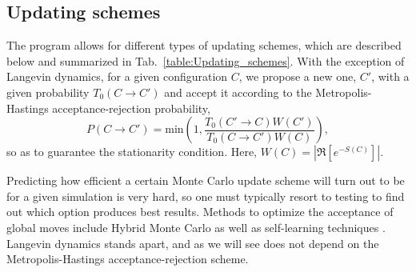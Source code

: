 
\subsection{Updating schemes}\label{sec:updating}
%
The program allows for different types of updating schemes, which are described below and summarized in Tab.~\ref{table:Updating_schemes}.  With  the exception of Langevin dynamics, for a given configuration $C$, we propose a new one, $C'$, with a given probability $T_0(C \rightarrow C')$  and accept it according to   the  Metropolis-Hastings   acceptance-rejection probability, 
\begin{equation}
	P(C \rightarrow C') =  \text{min}  \left( 1, \frac{T_0(C' \rightarrow C) W(C')}{T_0(C \rightarrow C') W(C)} \right),
\end{equation}
so as to guarantee the stationarity condition.  Here, $ W(C) = \left| \Re \left[ e^{-S(C)} \right] \right| $.

Predicting how efficient a certain Monte Carlo update scheme will turn out to be for a given simulation is very hard, so one must typically resort to testing to find out which option produces best results.   Methods to optimize the acceptance of  global moves include Hybrid Monte Carlo  \cite{Duane85} as well as self-learning techniques  \cite{LiuJ17,Xu17a}.      Langevin dynamics stands apart, and as we will see does not depend on the Metropolis-Hastings   acceptance-rejection scheme.

